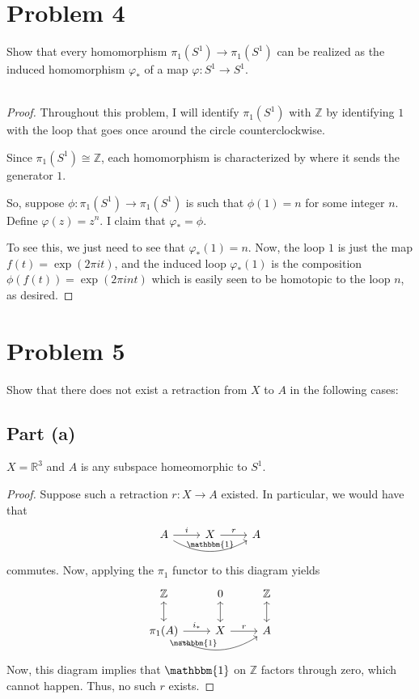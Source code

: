 \documentclass[fontsize=11pt]{scrartcl} %
\numberwithin{equation}{section} %
\numberwithin{figure}{section} %
\numberwithin{table}{section} %
\newcommand{\R}{\mathbb{R}}
\newcommand{\Z}{\mathbb{Z}}
\begin{document}
\section*{Problem 4}
Show that every homomorphism $\pi_1(S^1)\to \pi_1(S^1)$ can be realized as the
induced homomorphism $\varphi_*$ of a map $\varphi:S^1\to S^1$.
\\
\\
\begin{proof}
    Throughout this problem, I will identify $\pi_1(S^1)$ with $\Z$ by
    identifying $1$ with the loop that goes once around the circle
    counterclockwise.

    Since $\pi_1(S^1) \cong \Z$, each homomorphism is characterized by where it
    sends the generator $1$.

    So, suppose $\phi:\pi_1(S^1)\to\pi_1(S^1)$ is such that $\phi(1) = n$ for
    some integer $n$. Define $\varphi(z) = z^n$. I claim that $\varphi_* =
    \phi$.

    To see this, we just need to see that $\varphi_*(1) = n$. Now, the loop $1$
    is just the map $f(t) = \exp(2\pi i t)$, and the induced loop $\varphi_*(1)$ is the
    composition $\phi(f(t)) = \exp(2\pi i nt)$ which is easily seen to be
    homotopic to the loop $n$, as desired.
\end{proof}

\section*{Problem 5}
Show that there does not exist a retraction from $X$ to $A$ in the following
cases:
\subsection*{Part (a)}
$X=\R^3$ and $A$ is any subspace homeomorphic to $S^1$.
\begin{proof}
    Suppose such a retraction $r:X\to A$ existed. In particular, we would have
    that
    \[
\begin{tikzcd}
    A\arrow{r}{i}\arrow[bend right]{rr}{\mathbbm{1}} &X\arrow{r}{r} &A
\end{tikzcd}
    \]
    commutes. Now, applying the $\pi_1$ functor to this diagram yields
    \[
\begin{tikzcd}
    \Z\arrow[leftrightarrow]{d} &0\arrow[leftrightarrow]{d}
    &\Z\arrow[leftrightarrow]{d}\\
    \pi_1(A)\arrow{r}{i_*}\arrow[bend right]{rr}{\mathbbm{1}} &X\arrow{r}{r} &A
\end{tikzcd}
    \]
    Now, this diagram implies that $\mathbbm{1}$ on $\Z$ factors through zero,
    which cannot happen. Thus, no such $r$ exists.
\end{proof}
\end{document}

